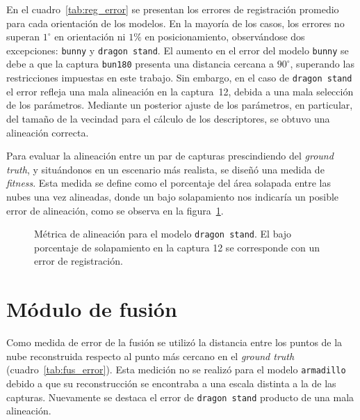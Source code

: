 	En el cuadro~\ref{tab:reg_error} se presentan los errores de registración promedio para cada orientación de los modelos.
	En la mayoría de los casos, los errores no superan $1^{\circ}$ en orientación ni $1\%$ en posicionamiento,
	observándose dos excepciones: \texttt{bunny} y \texttt{dragon stand}.
	El aumento en el error del modelo \texttt{bunny} se debe a que la captura \texttt{bun180} presenta una distancia cercana a $90^\circ$,
	superando las restricciones impuestas en este trabajo.
	Sin embargo, en el caso de \texttt{dragon stand} el error refleja una mala
	alineación en la captura~12, debida a una mala selección de los parámetros.
	Mediante un posterior ajuste de los parámetros, en particular, del tamaño de la vecindad para el cálculo de los descriptores, se obtuvo una alineación correcta.

	

	Para evaluar la alineación entre un par de capturas prescindiendo del \emph{ground truth}, y situándonos en un escenario más realista,
	se diseñó una medida de \emph{fitness}.
	Esta medida se define como el porcentaje del área solapada entre las nubes una vez alineadas,
	donde un bajo solapamiento nos indicaría un posible error de alineación, como
	se observa en la figura~\ref{fig:fitness}.

	\begin{figure}
		\centering
			
		\caption[Métrica de alineación para el modelo \texttt{dragon stand}]{\label{fig:fitness}Métrica de alineación para el modelo \texttt{dragon stand}. El bajo
		porcentaje de solapamiento en la captura 12 se corresponde
		con un error de registración.}
	\end{figure}


	\section{Módulo de fusión}

	Como medida de error de la fusión se utilizó la distancia entre los puntos de la nube reconstruida
	respecto al punto más cercano en el \emph{ground truth} (cuadro~\ref{tab:fus_error}).
	Esta medición no se realizó para el modelo \texttt{armadillo} debido a que su reconstrucción
	se encontraba a una escala distinta a la de las capturas.
	Nuevamente se destaca el error de \texttt{dragon stand} producto de una mala alineación.

